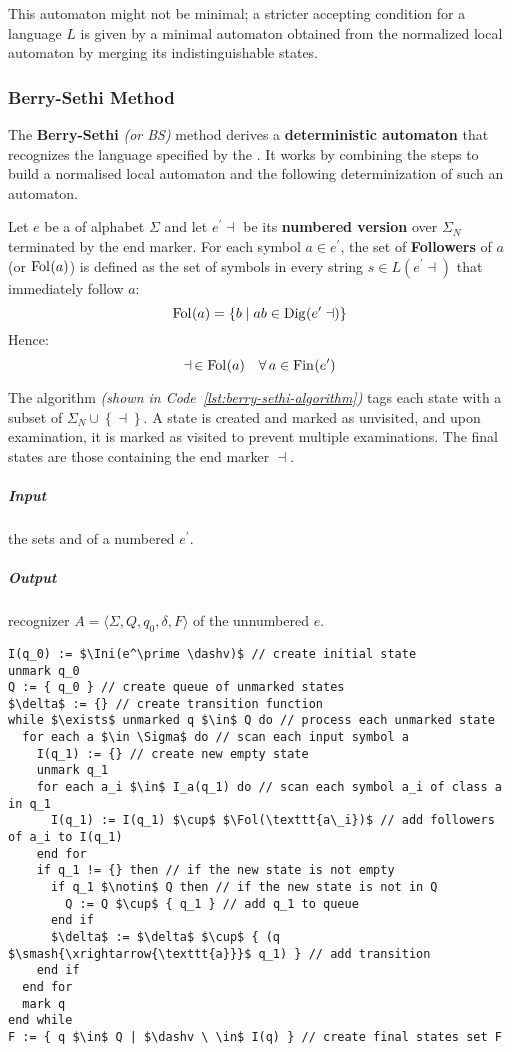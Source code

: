\documentclass[english]{article}
\begin{document}
This automaton might not be minimal;
a stricter accepting condition for a language \(L\) is given by a minimal automaton obtained from the normalized local automaton by merging its indistinguishable states.

\subsubsection{Berry-Sethi Method}
\label{sec:berry-sethi-method}

The \textbf{Berry-Sethi} \textit{(or BS)} method derives a \textbf{deterministic automaton} that recognizes the language specified by the \re.
It works by combining the steps to build a normalised local automaton and the following determinization of such an automaton.

\bigskip
Let \(e\) be a \textbf{\re} of alphabet \(\Sigma\) and let \(e^\prime \dashv\) be its \textbf{numbered version} over \(\Sigma_N\) terminated by the end marker.
For each symbol \(a \in e^\prime\), the set of \textbf{Followers} of \(a\) (or \(\text{Fol}\hspace{0.1ex}(a)\)) is defined as the set of symbols in every string \(s \in L(e^\prime \dashv)\) that immediately follow \(a\):
\[ \text{Fol}\hspace{0.1ex}(a) = \left\{ b \mid ab \in \text{Dig}\hspace{0.1ex}(e^\prime \dashv) \right\} \]
Hence:
\[ \dashv \, \in \text{Fol}\hspace{0.1ex}(a) \quad \forall \, a \in \text{Fin}\hspace{0.1ex}(e^\prime) \]

The algorithm \textit{(shown in Code~\ref{lst:berry-sethi-algorithm})} tags each state with a subset of \(\Sigma_N \cup \left\{ \dashv \right\}\).
A state is created and marked as unvisited, and upon examination, it is marked as visited to prevent multiple examinations.
The final states are those containing the end marker \(\dashv\).

\subparagraph*{Input}
the sets \Ini and \Fol of a numbered \re \(e^\prime\).

\subparagraph*{Output}
recognizer \(A = \langle \Sigma, Q, q_0, \delta,  F \rangle\) of the unnumbered \re \(e\).

\begin{lstlisting}[caption={Berry-Sethi Algorithm}, label=lst:berry-sethi-algorithm]
I(q_0) := $\Ini(e^\prime \dashv)$ // create initial state
unmark q_0
Q := { q_0 } // create queue of unmarked states
$\delta$ := {} // create transition function
while $\exists$ unmarked q $\in$ Q do // process each unmarked state
  for each a $\in \Sigma$ do // scan each input symbol a
    I(q_1) := {} // create new empty state
    unmark q_1
    for each a_i $\in$ I_a(q_1) do // scan each symbol a_i of class a in q_1
      I(q_1) := I(q_1) $\cup$ $\Fol(\texttt{a\_i})$ // add followers of a_i to I(q_1)
    end for
    if q_1 != {} then // if the new state is not empty
      if q_1 $\notin$ Q then // if the new state is not in Q
        Q := Q $\cup$ { q_1 } // add q_1 to queue
      end if
      $\delta$ := $\delta$ $\cup$ { (q $\smash{\xrightarrow{\texttt{a}}}$ q_1) } // add transition
    end if
  end for
  mark q
end while
F := { q $\in$ Q | $\dashv \ \in$ I(q) } // create final states set F
\end{lstlisting}
\end{document}
